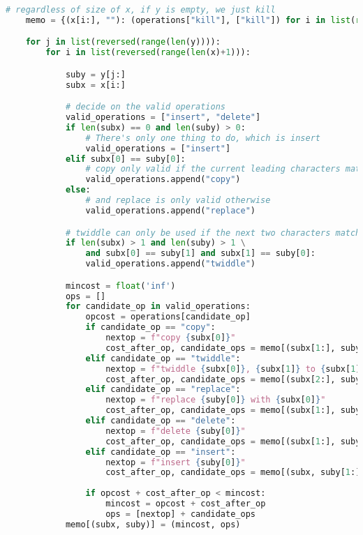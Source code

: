 \documentclass[]{book}
\theoremstyle{definition}
\begin{document}
\begin{enumerate}[label={\alph*.}]
\begin{lstlisting}[language=Python, caption=Edit Distance Bottom-Up Memoization, label=snip:editdistance-bottomup]
    # regardless of size of x, if y is empty, we just kill
    memo = {(x[i:], ""): (operations["kill"], ["kill"]) for i in list(range(len(x)+1))}

    for j in list(reversed(range(len(y)))):
        for i in list(reversed(range(len(x)+1))):

            suby = y[j:]
            subx = x[i:]

            # decide on the valid operations
            valid_operations = ["insert", "delete"]
            if len(subx) == 0 and len(suby) > 0:
                # There's only one thing to do, which is insert
                valid_operations = ["insert"]
            elif subx[0] == suby[0]:
                # copy only valid if the current leading characters match
                valid_operations.append("copy")
            else:
                # and replace is only valid otherwise
                valid_operations.append("replace")

            # twiddle can only be used if the next two characters match
            if len(subx) > 1 and len(suby) > 1 \
                and subx[0] == suby[1] and subx[1] == suby[0]:
                valid_operations.append("twiddle")

            mincost = float('inf')
            ops = []
            for candidate_op in valid_operations:
                opcost = operations[candidate_op]
                if candidate_op == "copy":
                    nextop = f"copy {subx[0]}"
                    cost_after_op, candidate_ops = memo[(subx[1:], suby[1:])]
                elif candidate_op == "twiddle":
                    nextop = f"twiddle {subx[0]}, {subx[1]} to {subx[1]}, {subx[0]}"
                    cost_after_op, candidate_ops = memo[(subx[2:], suby[2:])]
                elif candidate_op == "replace":
                    nextop = f"replace {suby[0]} with {subx[0]}"
                    cost_after_op, candidate_ops = memo[(subx[1:], suby[1:])]
                elif candidate_op == "delete":
                    nextop = f"delete {suby[0]}"
                    cost_after_op, candidate_ops = memo[(subx[1:], suby)]
                elif candidate_op == "insert":
                    nextop = f"insert {suby[0]}"
                    cost_after_op, candidate_ops = memo[(subx, suby[1:])]
                
                if opcost + cost_after_op < mincost:
                    mincost = opcost + cost_after_op
                    ops = [nextop] + candidate_ops
            memo[(subx, suby)] = (mincost, ops)


\end{lstlisting}
\end{enumerate}
\end{document}

